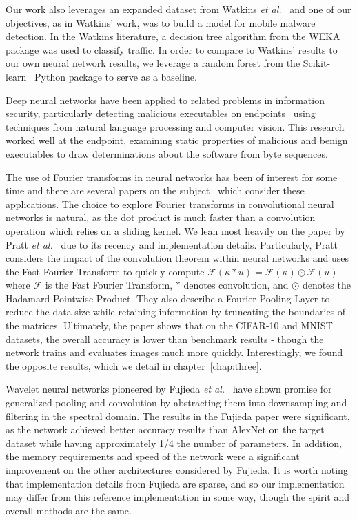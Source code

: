 Our work also leverages an expanded dataset from Watkins \textit{et al.}~\cite{watkins2013using} and one of our objectives, as in Watkins' work, was to build a model for mobile malware detection.
In the Watkins literature, a decision tree algorithm from the WEKA package was used to classify traffic. 
In order to compare to Watkins' results to our own neural network results, we leverage a random forest from the Scikit-learn~\cite{scikit-learn} Python package to serve as a baseline.

Deep neural networks have been applied to related problems in information security, particularly detecting malicious executables on endpoints~\cite{raff2018malware} using techniques from natural language processing and computer vision.
This research worked well at the endpoint, examining static properties of malicious and benign executables to draw determinations about the software from byte sequences.

The use of Fourier transforms in neural networks has been of interest for some time and there are several papers on the subject~\cite{osowski2002fourier, pratt2017fcnn, highlander2016very} which consider these applications.
The choice to explore Fourier transforms in convolutional neural networks is natural, as the dot product is much faster than a convolution operation which relies on a sliding kernel. 
We lean most heavily on the paper by Pratt \textit{et al.}~\cite{pratt2017fcnn} due to its recency and implementation details. 
Particularly, Pratt considers the impact of the convolution theorem within neural networks and uses the Fast Fourier Transform to quickly compute $\mathcal{F}(\kappa * u) = \mathcal{F}(\kappa) \odot \mathcal{F}(u)$ where $\mathcal{F}$ is the Fast Fourier Transform, $*$ denotes convolution, and $\odot$ denotes the Hadamard Pointwise Product.
They also describe a Fourier Pooling Layer to reduce the data size while retaining information by truncating the boundaries of the matrices.
Ultimately, the paper shows that on the CIFAR-10 and MNIST datasets, the overall accuracy is lower than benchmark results - though the network trains and evaluates images much more quickly.
Interestingly, we found the opposite results, which we detail in chapter~\ref{chap:three}.

Wavelet neural networks pioneered by Fujieda \textit{et al.}~\cite{fujieda2017wavelet} have shown promise for generalized pooling and convolution by abstracting them into downsampling and filtering in the spectral domain.
The results in the Fujieda paper were significant, as the network achieved better accuracy results than AlexNet on the target dataset while having approximately 1/4 the number of parameters.
In addition, the memory requirements and speed of the network were a significant improvement on the other architectures considered by Fujieda.
It is worth noting that implementation details from Fujieda are sparse, and so our implementation may differ from this reference implementation in some way, though the spirit and overall methods are the same.
